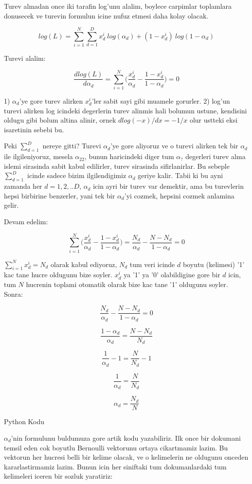\documentclass[12pt,fleqn]{article}
\begin{document}
Turev almadan once iki tarafin log'unu alalim, boylece carpimlar toplamlara
donusecek ve turevin formulun icine nufuz etmesi daha kolay olacak.

\[ log(L) = \sum_{i=1}^N \sum_{d=1}^{D} {x_d^i}\ log (\alpha_d) + 
(1-x_d^i)\ log (1-\alpha_d) \]

Turevi alalim:

\[ \frac{dlog(L)}{d\alpha_d} = \sum_{i=1}^N \bigg( \frac{x_d^i}{\alpha_d} -
\frac{1-x_d^i}{1-\alpha_d} \bigg) = 0
 \]

1) $\alpha_d$'ye gore turev alirken $x_d^i$'ler sabit sayi gibi muamele
gorurler. 2) log'un turevi alirken log icindeki degerlerin turev alinmis hali
bolumun ustune, kendisini oldugu gibi bolum altina alinir, ornek 
$dlog(-x)/dx = -1/x$ olur ustteki eksi isaretinin sebebi bu. 

Peki $\sum_{d=1}^{D}$ nereye gitti? Turevi $\alpha_d$'ye gore aliyoruz ve o
turevi alirken tek bir $\alpha_d$ ile ilgileniyoruz, mesela $\alpha_{22}$,
bunun haricindeki diger tum $\alpha_?$ degerleri turev alma islemi
sirasinda sabit kabul edilirler, turev sirasinda sifirlanirlar. Bu sebeple
$\sum_{d=1}^{D}$ icinde sadece bizim ilgilendigimiz $\alpha_d$ geriye
kalir. Tabii ki bu ayni zamanda her $d=1,2,..D$, $\alpha_d$ icin ayri bir
turev var demektir, ama bu turevlerin hepsi birbirine benzerler, yani tek
bir $\alpha_d$'yi cozmek, hepsini cozmek anlamina gelir.

Devam edelim:

\[ \sum_{i=1}^N \bigg( \frac{x_d^i}{\alpha_d} - \frac{1-x_d^i}{1-\alpha_d} \bigg) =
\frac{N_d}{\alpha_d} - \frac{N-N_d}{1-\alpha_d} = 0
 \]

$\sum_{i=1}^N x_d^i = N_d$ olarak kabul ediyoruz, $N_d$ tum veri icinde $d$
boyutu (kelimesi) '1' kac tane hucre oldugunu bize soyler. $x_d^i$ ya '1' ya '0'
olabildigine gore bir $d$ icin, tum $N$ hucrenin toplami otomatik olarak bize
kac tane '1' oldugunu soyler. Sonra:

\[ \frac{N_d}{\alpha_d} - \frac{N-N_d}{1-\alpha_d} = 0  \]

\[ \frac{1-\alpha_d}{\alpha_d} = \frac{N-N_d}{N_d}   \]

\[ \frac{1}{\alpha_d} - 1 = \frac{N}{N_d} - 1  \]

\[ \frac{1}{\alpha_d} = \frac{N}{N_d}  \]

\[ \alpha_d = \frac{N_d}{N}  \]

Python Kodu

$\alpha_d$'nin formulunu buldumuza gore artik kodu yazabiliriz. Ilk once bir
dokumani temsil eden cok boyutlu Bernoulli vektorunu ortaya cikartmamiz
lazim. Bu vektorun her hucresi belli bir kelime olacak, ve o kelimelerin ne
oldugunu onceden kararlastirmamiz lazim. Bunun icin her siniftaki tum
dokumanlardaki tum kelimeleri iceren bir sozluk yaratiriz:
\end{document}
